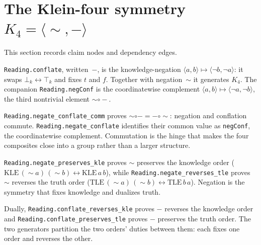 \section{The Klein-four symmetry $K_4 = \langle{\sim},{-}\rangle$}

This section records claim nodes and dependency edges.

\begin{proposition}\label{thm:conflate}\leanok{}
\texttt{Reading.conflate}, written~$-$, is the knowledge-negation $\langle a, b\rangle \mapsto \langle \neg b, \neg a\rangle$: it swaps $\bot_k \leftrightarrow \top_k$ and fixes $t$ and $f$. Together with negation~$\sim$ it generates $K_4$. The companion \texttt{Reading.negConf} is the coordinatewise complement $\langle a, b\rangle \mapsto \langle \neg a, \neg b\rangle$, the third nontrivial element ${\sim}\circ{-}$.
\end{proposition}
\begin{theorem}\label{thm:negate-conflate-comm}\leanok{}
\texttt{Reading.negate\_conflate\_comm} proves ${\sim}\circ{-} = {-}\circ{\sim}$: negation and conflation commute. \texttt{Reading.negate\_conflate} identifies their common value as \texttt{negConf}, the coordinatewise complement. Commutation is the hinge that makes the four composites close into a group rather than a larger structure.
\end{theorem}
\begin{theorem}\label{thm:negate-orders}\leanok{}
\texttt{Reading.negate\_preserves\_kle} proves $\sim$ preserves the knowledge order ($\mathrm{KLE}\,({\sim}a)\,({\sim}b) \leftrightarrow \mathrm{KLE}\,a\,b$), while \texttt{Reading.negate\_reverses\_tle} proves $\sim$ reverses the truth order ($\mathrm{TLE}\,({\sim}a)\,({\sim}b) \leftrightarrow \mathrm{TLE}\,b\,a$). Negation is the symmetry that fixes knowledge and dualizes truth.
\end{theorem}
\begin{theorem}\label{thm:conflate-orders}\leanok{}
Dually, \texttt{Reading.conflate\_reverses\_kle} proves $-$ reverses the knowledge order and \texttt{Reading.conflate\_preserves\_tle} proves $-$ preserves the truth order. The two generators partition the two orders' duties between them: each fixes one order and reverses the other.
\end{theorem}
